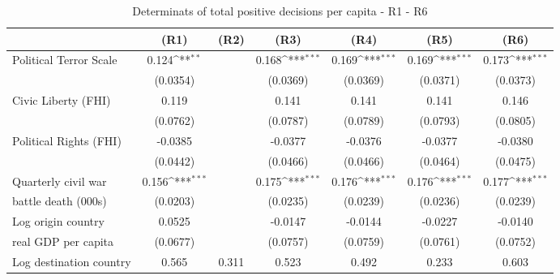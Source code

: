 \begin{table}[!ht]\centering \scriptsize
\def\sym#1{\ifmmode^{#1}\else\(^{#1}\)\fi}
\caption{Determinats of total positive decisions per capita - R1 - R6}
\begin{tabular}{l*{6}{c}}
\hline\hline
                    &\multicolumn{1}{c}{(R1)}&\multicolumn{1}{c}{(R2)}&\multicolumn{1}{c}{(R3)}&\multicolumn{1}{c}{(R4)}&\multicolumn{1}{c}{(R5)}&\multicolumn{1}{c}{(R6)}\\
\hline
Political Terror Scale&       0.124\sym{**} &                     &       0.168\sym{***}&       0.169\sym{***}&       0.169\sym{***}&       0.173\sym{***}\\
                    &    (0.0354)         &                     &    (0.0369)         &    (0.0369)         &    (0.0371)         &    (0.0373)         \\
[0,5em]
Civic Liberty (FHI) &       0.119         &                     &       0.141         &       0.141         &       0.141         &       0.146         \\
                    &    (0.0762)         &                     &    (0.0787)         &    (0.0789)         &    (0.0793)         &    (0.0805)         \\
[0,5em]
Political Rights (FHI)&     -0.0385         &                     &     -0.0377         &     -0.0376         &     -0.0377         &     -0.0380         \\
                    &    (0.0442)         &                     &    (0.0466)         &    (0.0466)         &    (0.0464)         &    (0.0475)         \\
[0,5em]
Quarterly civil war&       0.156\sym{***}&                     &       0.175\sym{***}&       0.176\sym{***}&       0.176\sym{***}&       0.177\sym{***}\\
 battle death (000s)            &    (0.0203)         &                     &    (0.0235)         &    (0.0239)         &    (0.0236)         &    (0.0239)         \\
[0,5em]
Log origin country&      0.0525         &                     &     -0.0147         &     -0.0144         &     -0.0227         &     -0.0140         \\
 real GDP per capita            &    (0.0677)         &                     &    (0.0757)         &    (0.0759)         &    (0.0761)         &    (0.0752)         \\
[0,5em]
Log destination country&       0.565         &       0.311         &       0.523         &       0.492         &       0.233         &       0.603         \\

\end{tabular}
\end{table}
